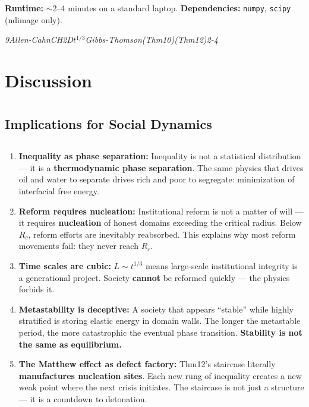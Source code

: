 \documentclass[12pt,a4paper]{article}
\theoremstyle{plain}
\theoremstyle{definition}
\newcommand{\Rc}{R_c}                 %
\newcommand{\cn}[1]{\textcolor{scxgray}{\textit{#1}}}
\begin{document}
\textbf{Runtime:} $\sim$2--4 minutes on a standard laptop.
\textbf{Dependencies:} \texttt{numpy}, \texttt{scipy} (ndimage only).

\bigskip
\noindent
\cn{9Allen-CahnCH2D$t^{1/3}$Gibbs-Thomson(Thm10)(Thm12)2-4}

\section{Discussion}
\section*{}

\subsection{Implications for Social Dynamics}
\subsection*{}

\begin{enumerate}[label=(\arabic*)]
    \item \textbf{Inequality as phase separation:} Inequality is not a statistical
          distribution — it is a \textbf{thermodynamic phase separation}. The same
          physics that drives oil and water to separate drives rich and poor to
          segregate: minimization of interfacial free energy.

    \item \textbf{Reform requires nucleation:} Institutional reform is not a matter
          of will — it requires \textbf{nucleation} of honest domains exceeding
          the critical radius. Below $\Rc$, reform efforts are inevitably reabsorbed.
          This explains why most reform movements fail: they never reach $\Rc$.

    \item \textbf{Time scales are cubic:} $L\sim t^{1/3}$ means large-scale
          institutional integrity is a generational project. Society \textbf{cannot}
          be reformed quickly — the physics forbids it.

    \item \textbf{Metastability is deceptive:} A society that appears ``stable''
          while highly stratified is storing elastic energy in domain walls.
          The longer the metastable period, the more catastrophic the eventual
          phase transition. \textbf{Stability is not the same as equilibrium.}

    \item \textbf{The Matthew effect as defect factory:} Thm12's staircase literally
          \textbf{manufactures nucleation sites}. Each new rung of inequality creates
          a new weak point where the next crisis initiates. The staircase is not
          just a structure — it is a countdown to detonation.
\end{enumerate}
\end{document}

